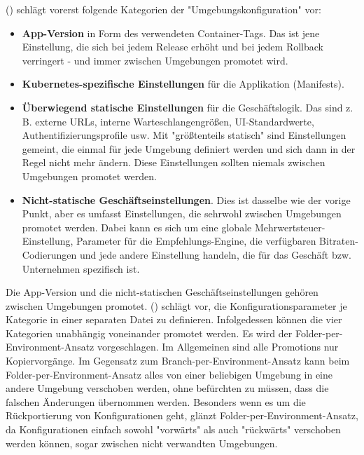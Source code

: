 \noindent
\citeauthor{codefreshHowToModelGitOpsEnvironmentsAndPromote} (\citeyear{codefreshHowToModelGitOpsEnvironmentsAndPromote})
schlägt vorerst folgende Kategorien der "Umgebungskonfiguration" vor:

\begin{itemize}
    \item \textbf{App-Version} in Form des verwendeten Container-Tags. Das ist jene Einstellung, die sich bei jedem Release erhöht und bei jedem Rollback verringert - und immer zwischen Umgebungen promotet wird.
    \item \textbf{Kubernetes-spezifische Einstellungen} für die Applikation (Manifests).
    \item \textbf{Überwiegend statische Einstellungen} für die Geschäftslogik. Das sind z. B. externe URLs, interne Warteschlangengrößen, UI-Standardwerte, Authentifizierungsprofile usw. Mit "größtenteils statisch" sind Einstellungen gemeint, die einmal für jede Umgebung definiert werden und sich dann in der Regel nicht mehr ändern. Diese Einstellungen sollten niemals zwischen Umgebungen promotet werden.
    \item \textbf{Nicht-statische Geschäftseinstellungen}. Dies ist dasselbe wie der vorige Punkt, aber es umfasst Einstellungen, die sehrwohl zwischen Umgebungen promotet werden. Dabei kann es sich um eine globale Mehrwertsteuer-Einstellung, Parameter für die Empfehlungs-Engine, die verfügbaren Bitraten-Codierungen und jede andere Einstellung handeln, die für das Geschäft bzw. Unternehmen spezifisch ist.
\end{itemize}

\noindent
Die App-Version und die nicht-statischen Geschäftseinstellungen gehören zwischen Umgebungen promotet.
\citeauthor{codefreshHowToModelGitOpsEnvironmentsAndPromote} (\citeyear{codefreshHowToModelGitOpsEnvironmentsAndPromote})
schlägt vor, die Konfigurationsparameter je Kategorie in einer separaten Datei zu definieren.
Infolgedessen können die vier Kategorien unabhängig voneinander promotet werden.
Es wird der Folder-per-Environment-Ansatz vorgeschlagen.
Im Allgemeinen sind alle Promotions nur Kopiervorgänge. 
Im Gegensatz zum Branch-per-Environment-Ansatz kann beim Folder-per-Environment-Ansatz 
alles von einer beliebigen Umgebung in eine andere Umgebung verschoben werden, 
ohne befürchten zu müssen, dass die falschen Änderungen übernommen werden. 
Besonders wenn es um die Rückportierung von Konfigurationen geht, glänzt Folder-per-Environment-Ansatz, 
da Konfigurationen einfach sowohl "vorwärts" als auch "rückwärts" verschoben werden können, 
sogar zwischen nicht verwandten Umgebungen.
\bigskip

